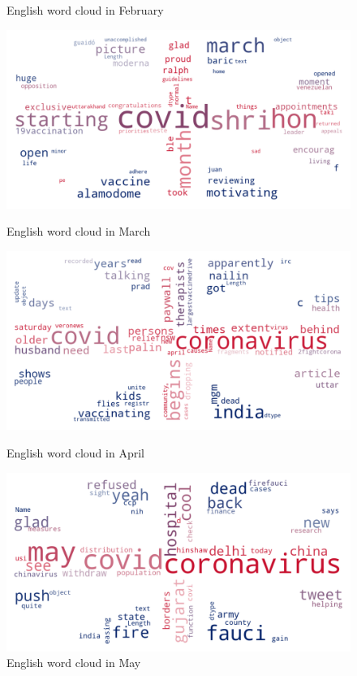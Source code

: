 \begin{landscape}
\begin{figure}[!htb]
  \caption{English word cloud in February}\label{fig:februaryUK}
\endminipage
\end{figure}
\begin{figure}[!htb]
  \includegraphics[width=\linewidth]{March en word cloud.png}
  \caption{English word cloud in March}\label{fig:marchUK}
\endminipage\hfill
{}
  \includegraphics[width=\linewidth]{April en word cloud.png}
  \caption{English word cloud in April}\label{fig:aprilUK}
\endminipage\hfill
{}
  \includegraphics[width=\linewidth]{May en word cloud.png}
  \caption{English word cloud in May}\label{fig:mayUK}
\endminipage
\end{figure}


\end{landscape}

